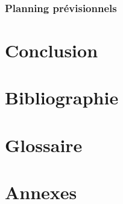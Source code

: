 \documentclass[a4paper]{article}
\begin{document}
\subsubsection{Planning prévisionnels}

\newpage
\section{Conclusion}

\newpage
\section{Bibliographie}

\newpage
\section{Glossaire}

\newpage
\appendix

\section{Annexes}
\end{document}

